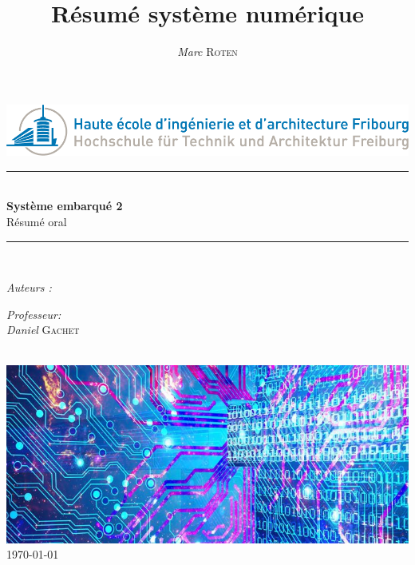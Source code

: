 

\title{Résumé système numérique} 
\author{\textsl{Marc} \textsc{Roten}}
\date{}
 

    \begin{titlepage}
        \begin{center}
            \includegraphics[scale=.4]{Img/heia-fr-logo.png}\\[1.3cm]
            
            \rule{\linewidth}{0.3mm} \\[0.3cm]
            {\huge \bfseries Système embarqué 2\\[0.5cm]} 
            {\Large Résumé oral }
            \rule{\linewidth}{0.3mm} \\[0.8cm]
            \noindent
            \begin{minipage}[t]{0.4\textwidth}
                \begin{flushleft} \large
                    \emph{Auteurs :}\\
                    \theauthor
                \end{flushleft}
            \end{minipage}
            \begin{minipage}[t]{0.4\textwidth} 
                \begin{flushright} \large
                    \emph{Professeur:}\\
                    \textsl{Daniel} \textsc{ Gachet}\\ 
                \end{flushright} 
                \vfill
            \end{minipage}\\[1.3cm]
            \includegraphics[scale=0.7]{Img/title.jpg}\\[1.5cm]
            \vspace*{1\baselineskip}
            \today \\[0.7cm]
        \end{center}
    \end{titlepage}
    \tableofcontents
    \clearpage

